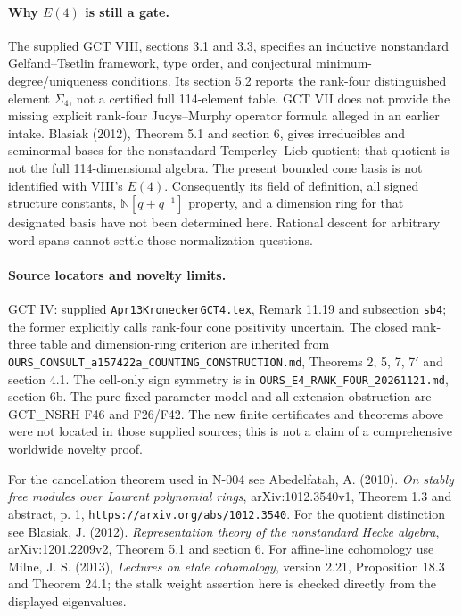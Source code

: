 \paragraph{Why $E(4)$ is still a gate.}
The supplied GCT VIII, sections 3.1 and 3.3, specifies an inductive
nonstandard Gelfand--Tsetlin framework, type order, and conjectural
minimum-degree/uniqueness conditions.  Its section 5.2 reports the
rank-four distinguished element $\Sigma_4$, not a certified full
114-element table.  GCT VII does not provide the missing explicit
rank-four Jucys--Murphy operator formula alleged in an earlier intake.
Blasiak (2012), Theorem 5.1 and section 6, gives irreducibles and
seminormal bases for the nonstandard Temperley--Lieb quotient; that
quotient is not the full 114-dimensional algebra.
The present bounded cone basis is not identified with VIII's $E(4)$.
Consequently its field of definition, all signed structure constants,
$\mathbb N[q+q^{-1}]$ property, and a dimension ring for that designated
basis have not been determined here.  Rational descent for arbitrary
word spans cannot settle those normalization questions.

\paragraph{Source locators and novelty limits.}
GCT IV: supplied \texttt{Apr13KroneckerGCT4.tex}, Remark 11.19 and
subsection \texttt{sb4}; the former explicitly calls rank-four cone
positivity uncertain.  The closed rank-three table and dimension-ring
criterion are inherited from
\nolinkurl{OURS_CONSULT_a157422a_COUNTING_CONSTRUCTION.md},
Theorems 2, 5, 7, 7$'$ and section 4.1.  The cell-only sign symmetry is
in \nolinkurl{OURS_E4_RANK_FOUR_20261121.md}, section 6b.
The pure fixed-parameter model and all-extension obstruction are
GCT\_NSRH F46 and F26/F42.  The new finite certificates and theorems
above were not located in those supplied sources; this is not a claim
of a comprehensive worldwide novelty proof.

For the cancellation theorem used in N-004 see Abedelfatah, A. (2010).
\emph{On stably free modules over Laurent polynomial rings},
arXiv:1012.3540v1, Theorem 1.3 and abstract, p. 1,
\texttt{https://arxiv.org/abs/1012.3540}.
For the quotient distinction see Blasiak, J. (2012).
\emph{Representation theory of the nonstandard Hecke algebra},
arXiv:1201.2209v2, Theorem 5.1 and section 6.
For affine-line cohomology use Milne, J. S. (2013),
\emph{Lectures on etale cohomology}, version 2.21, Proposition 18.3
and Theorem 24.1; the stalk weight assertion here is checked directly
from the displayed eigenvalues.


